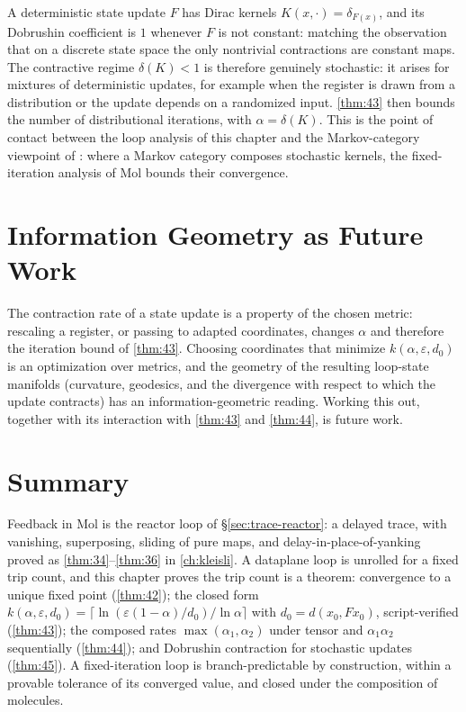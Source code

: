 \begin{remark}
A deterministic state update $F$ has Dirac kernels $K (x,\cdot) = \delta_{F (x)}$, and its Dobrushin coefficient is $1$ whenever $F$ is not constant: matching the observation that on a discrete state space the only nontrivial contractions are constant maps. The contractive regime $\delta (K) < 1$ is therefore genuinely stochastic: it arises for mixtures of deterministic updates, for example when the register is drawn from a distribution or the update depends on a randomized input. \autoref{thm:43} then bounds the number of distributional iterations, with $\alpha = \delta (K)$. This is the point of contact between the loop analysis of this chapter and the Markov-category viewpoint of \citep{arxiv-markov-categories}: where a Markov category composes stochastic kernels, the fixed-iteration analysis of Mol bounds their convergence.
\end{remark}

\section{Information Geometry as Future Work}\label{sec:trace-geometry}

The contraction rate of a state update is a property of the chosen metric: rescaling a register, or passing to adapted coordinates, changes $\alpha$ and therefore the iteration bound of \autoref{thm:43}. Choosing coordinates that minimize $k (\alpha,\varepsilon,d_0)$ is an optimization over metrics, and the geometry of the resulting loop-state manifolds (curvature, geodesics, and the divergence with respect to which the update contracts) has an information-geometric reading. Working this out, together with its interaction with \autoref{thm:43} and \autoref{thm:44}, is future work.

\section{Summary}\label{sec:trace-summary}

Feedback in Mol is the reactor loop of \S\ref{sec:trace-reactor}: a delayed trace, with vanishing, superposing, sliding of pure maps, and delay-in-place-of-yanking proved as \autoref{thm:34}--\autoref{thm:36} in \autoref{ch:kleisli}. A dataplane loop is unrolled for a fixed trip count, and this chapter proves the trip count is a theorem: convergence to a unique fixed point (\autoref{thm:42}); the closed form $k (\alpha,\varepsilon,d_0) = \lceil \ln (\varepsilon (1-\alpha)/d_0)/\ln\alpha \rceil$ with $d_0 = d (x_0, F x_0)$, script-verified (\autoref{thm:43}); the composed rates $\max (\alpha_1,\alpha_2)$ under tensor and $\alpha_1\alpha_2$ sequentially (\autoref{thm:44}); and Dobrushin contraction for stochastic updates (\autoref{thm:45}). A fixed-iteration loop is branch-predictable by construction, within a provable tolerance of its converged value, and closed under the composition of molecules.

